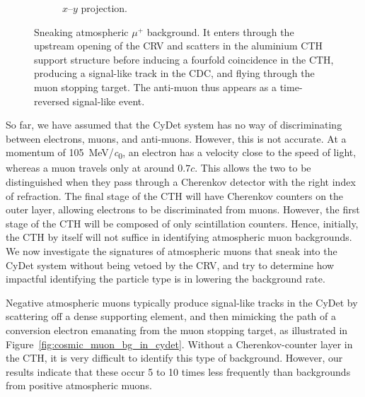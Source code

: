 \begin{figure}
\begin{subfigure}{0.43\textwidth}
        \caption{$x$--$y$ projection.}
    \end{subfigure}
    \caption[Sneaking atmospheric $\mu^+$ background event]{ Sneaking
        atmospheric $\mu^+$ background. It enters through the upstream opening
        of the CRV and scatters in the aluminium CTH support structure before
        inducing a fourfold coincidence in the CTH, producing a signal-like
        track in the CDC, and flying through the muon stopping target. The
        anti-muon thus appears as a time-reversed signal-like event. }
    \label{fig:cosmic_antimuon_bg_in_cydet}
\end{figure}

So far, we have assumed that the CyDet system has no way of discriminating
between electrons, muons, and anti-muons. However, this is not accurate. At
a momentum of \SI{105}{\MeV/\clight}, an electron has a velocity close to the speed of
light, whereas a muon travels only at around $0.7 c$. This allows the two to be
distinguished when they pass through a Cherenkov detector with the right index
of refraction. The final stage of the CTH will have Cherenkov counters on the
outer layer, allowing electrons to be discriminated from muons. However, the
first stage of the CTH will be composed of only scintillation counters. Hence,
initially, the CTH by itself will not suffice in identifying atmospheric muon
backgrounds. We now investigate the signatures of atmospheric muons that sneak
into the CyDet system without being vetoed by the CRV, and try to determine how
impactful identifying the particle type is in lowering the background rate.



Negative atmospheric muons typically produce signal-like tracks in the CyDet by
scattering off a dense supporting element, and then mimicking the path of a
conversion electron emanating from the muon stopping target, as illustrated in
Figure~\ref{fig:cosmic_muon_bg_in_cydet}. Without a Cherenkov-counter layer in
the CTH, it is very difficult to identify this type of background. However, our
results indicate that these occur 5 to 10 times less frequently than backgrounds
from positive atmospheric muons.

